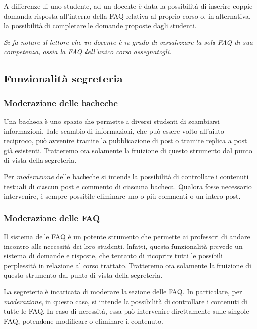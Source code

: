 \documentclass [a4paper,11pt]{book}
\begin{document}
A differenze di uno studente, ad un docente è data la possibilità di inserire coppie domanda-risposta all'interno della FAQ relativa al proprio corso o, in alternativa, la possibilità di completare le domande proposte dagli studenti.

\emph{Si fa notare al lettore che un docente è in grado di visualizzare la sola FAQ di sua competenza, ossia la FAQ dell'unico corso assegnatogli.}
\medskip

\subsection{Funzionalità segreteria}

\subsubsection{Moderazione delle bacheche}

Una bacheca è uno spazio che permette a diversi studenti di scambiarsi informazioni. Tale scambio di informazioni, che può essere volto all'aiuto reciproco, può avvenire tramite la pubblicazione di post o tramite replica a post già esistenti. Tratteremo ora solamente la fruizione di questo strumento dal punto di vista della segreteria.

Per \emph{moderazione} delle bacheche si intende la possibilità di controllare i contenuti testuali di ciascun post e commento di ciascuna bacheca. Qualora fosse necessario intervenire, è sempre possibile eliminare uno o più commenti o un intero post. 

\medskip

\subsubsection{Moderazione delle FAQ}

Il sistema delle FAQ è un potente strumento che permette ai professori di andare incontro alle necessità dei loro studenti. Infatti, questa funzionalità prevede un sistema di domande e risposte, che tentanto di ricoprire tutti le possibili perplessità in relazione al corso trattato. Tratteremo ora solamente la fruizione di questo strumento dal punto di vista della segreteria.

La segreteria è incaricata di moderare la sezione delle FAQ. In particolare, per \emph{moderazione}, in questo caso, si intende la possibilità di controllare i contenuti di tutte le FAQ. In caso di necessità, essa può intervenire direttamente sulle singole FAQ, potendone modificare o eliminare il contenuto. 
\end{document}
